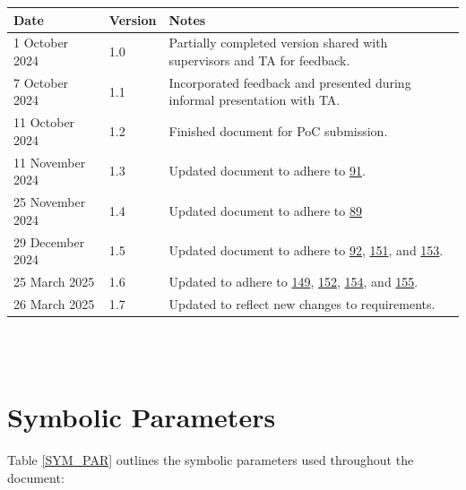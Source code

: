 \documentclass[12pt]{article}
\begin{document}
\begin{tabularx}{\textwidth}{p{4cm}p{1.5cm}X} \toprule {\textbf{Date}} &
  {\textbf{Version}} & {\textbf{Notes}}\\
  \midrule
  1 October 2024 & 1.0 & Partially completed version shared with supervisors and TA for feedback.\\
  7 October 2024 & 1.1 & Incorporated feedback and presented during informal presentation with TA.\\
  11 October 2024 & 1.2 & Finished document for PoC submission.\\
  11 November 2024 & 1.3 & Updated document to adhere to
  \href{https://github.com/SumanyaG/Alkalytics/issues/91}{91}.\\
  25 November 2024 & 1.4 & Updated document to adhere to
  \href{https://github.com/SumanyaG/Alkalytics/issues/89}{89} \\
  29 December 2024 & 1.5 & Updated document to adhere to
  \href{https://github.com/SumanyaG/Alkalytics/issues/92}{92},
  \href{https://github.com/SumanyaG/Alkalytics/issues/151}{151}, and
  \href{https://github.com/SumanyaG/Alkalytics/issues/153}{153}.\\ 
  25 March 2025 & 1.6 & Updated to adhere to 
  \href{https://github.com/SumanyaG/Alkalytics/issues/149}{149}, 
  \href{https://github.com/SumanyaG/Alkalytics/issues/152}{152}, 
  \href{https://github.com/SumanyaG/Alkalytics/issues/154}{154}, and 
  \href{https://github.com/SumanyaG/Alkalytics/issues/155}{155}. \\
  26 March 2025 & 1.7 & Updated to reflect new changes to requirements.\\
  \bottomrule
\end{tabularx}

~\\

~\newpage
{}
\section{Symbolic Parameters}
Table \ref{SYM_PAR} outlines the symbolic parameters used throughout the document:
\end{document}
